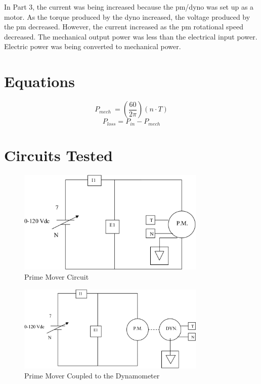 \documentclass{article}
\begin{document}
In Part 3, the current was being increased because the \gls{pm}/\gls{dyno} was
set up as a motor. As the torque produced by the \gls{dyno} increased, the
voltage produced by the \gls{pm} decreased. However, the current increased as
the \gls{pm} rotational speed decreased. The mechanical output power was less
than the electrical input power. Electric power was being converted to
mechanical power.

\section*{Equations}

\[P_{mech}\ = \left( \frac{60}{2\pi} \right) (n \cdot T)\]
\[P_{loss} = P_{in} - P_{mech}\]

\section*{Circuits Tested}

\begin{figure}[H]
  \centering
  \includegraphics[width=0.8\textwidth]{img/circuit_01}
  \caption{Prime Mover Circuit}
  \label{fig:circuit_01}
\end{figure}

\begin{figure}[H]
  \centering
  \includegraphics[width=0.8\textwidth]{img/circuit_02}
  \caption{Prime Mover Coupled to the Dynamometer}
  \label{fig:circuit_02}
\end{figure}
\end{document}
